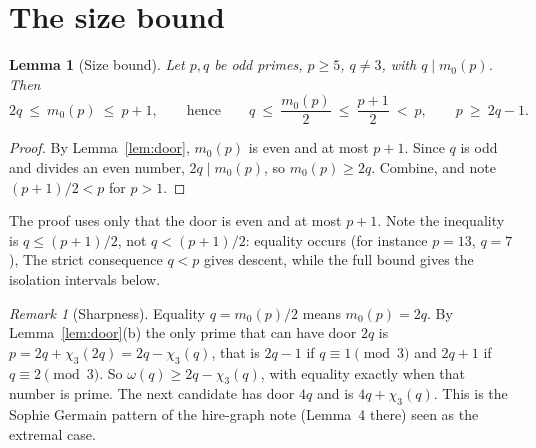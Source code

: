 \documentclass[11pt,a4paper]{article}
\newtheorem{lemma}[theorem]{Lemma}
\theoremstyle{remark}
\newtheorem{remark}[theorem]{Remark}
\newcommand{\chit}{\chi_3}
\begin{document}
\section{The size bound}\label{sec:size}

\begin{lemma}[Size bound]\label{lem:size}
Let \(p,q\) be odd primes, \(p\ge5\), \(q\ne3\), with \(q\mid m_0(p)\).
Then
\[
2q\ \le\ m_0(p)\ \le\ p+1,\qquad\text{hence}\qquad q\ \le\ \frac{m_0(p)}2\ \le\ \frac{p+1}2\ <\ p,\qquad p\ \ge\ 2q-1 .
\]
\end{lemma}
\begin{proof}
By Lemma~\ref{lem:door}, \(m_0(p)\) is even and at most \(p+1\).
Since \(q\) is odd and divides an even number, \(2q\mid m_0(p)\), so \(m_0(p)\ge 2q\).
Combine, and note \((p+1)/2<p\) for \(p>1\).
\end{proof}

The proof uses only that the door is even and at most \(p+1\).
Note the inequality is \(q\le (p+1)/2\), not \(q<(p+1)/2\): equality occurs (for instance \(p=13\), \(q=7\)), The strict consequence \(q<p\) gives descent, while the full bound gives the isolation intervals below.

\begin{remark}[Sharpness]\label{rem:sharp}
Equality \(q=m_0(p)/2\) means \(m_0(p)=2q\).
By Lemma~\ref{lem:door}(b) the only prime that can have door \(2q\) is \(p=2q+\chit(2q)=2q-\chit(q)\), that is \(2q-1\) if \(q\equiv1\pmod 3\) and \(2q+1\) if \(q\equiv 2\pmod 3\).
So \(\omega(q)\ge 2q-\chit(q)\), with equality exactly when that number is prime.
The next candidate has door \(4q\) and is \(4q+\chit(q)\).
This is the Sophie Germain pattern of the hire-graph note (Lemma~4 there) seen as the extremal case.
\end{remark}
\end{document}
